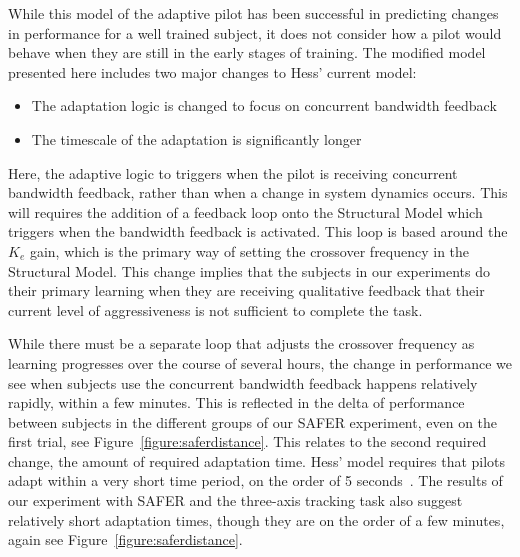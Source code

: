 While this model of the adaptive pilot has been successful in predicting changes in performance for a well trained subject, it does not consider how a pilot would behave when they are still in the early stages of training.
The modified model presented here includes two major changes to Hess' current model:
\begin{itemize}
    \item The adaptation logic is changed to focus on concurrent bandwidth feedback
    \item The timescale of the adaptation is significantly longer
\end{itemize}

Here, the adaptive logic to triggers when the pilot is receiving concurrent bandwidth feedback, rather than when a change in system dynamics occurs.
This will requires the addition of a feedback loop onto the Structural Model which triggers when the bandwidth feedback is activated.
This loop is based around the $K_e$ gain, which is the primary way of setting the crossover frequency in the Structural Model.
This change implies that the subjects in our experiments do their primary learning when they are receiving qualitative feedback that their current level of aggressiveness is not sufficient to complete the task.

While there must be a separate loop that adjusts the crossover frequency as learning progresses over the course of several hours, the change in performance we see when subjects use the concurrent bandwidth feedback happens relatively rapidly, within a few minutes.
This is reflected in the delta of performance between subjects in the different groups of our SAFER experiment, even on the first trial, see Figure~\ref{figure:saferdistance}.
This relates to the second required change, the amount of required adaptation time.
Hess' model requires that pilots adapt within a very short time period, on the order of 5 seconds~\citep{weir_model_1966}.
The results of our experiment with SAFER and the three-axis tracking task also suggest relatively short adaptation times, though they are on the order of a few minutes, again see Figure~\ref{figure:saferdistance}.


